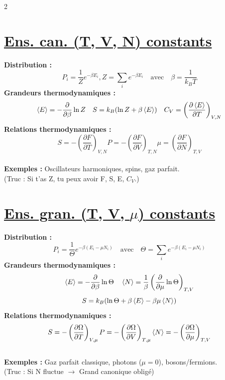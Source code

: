 \documentclass[11pt]{article}
\begin{document}
\begin{multicols}{2}
\section{\underline{Ens. can. (T, V, N) constants}}
\textbf{Distribution :}
\begin{equation*}
  \boxed{P_i = \frac{1}{Z} e^{-\beta E_i}}, \boxed{Z = \sum_i e^{-\beta E_i}} \quad \text{avec} \quad \beta = \frac{1}{k_B T}
\end{equation*}
\textbf{Grandeurs thermodynamiques :}
\begin{equation*}
  \braket{E}=-\dfrac{\partial}{\partial\beta} \ln Z \quad S = k_B(\ln Z + \beta \braket{E})\quad C_V = \left( \frac{\partial \braket{E}}{\partial T} \right)_{V, N}
\end{equation*}
\textbf{Relations thermodynamiques :}
\begin{equation*}
  S = -\left( \frac{\partial F}{\partial T} \right)_{V, N}  P = -\left( \frac{\partial F}{\partial V} \right)_{T, N}  \mu = \left( \frac{\partial F}{\partial N} \right)_{T, V}
\end{equation*}\\
\textbf{Exemples :} Oscillateurs harmoniques, spins, gaz parfait.\\
(Truc : Si t'as Z, tu peux avoir F, S, E, $C_V$.)\\

\section{\underline{Ens. gran. (T, V, $\mu$) constants}}
\textbf{Distribution :}
\begin{equation*}
  \boxed{P_i = \frac{1}{\Theta} e^{-\beta (E_i - \mu N_i)}} \quad \text{avec} \quad \boxed{\Theta = \sum_i e^{-\beta (E_i - \mu N_i)}}
\end{equation*}
\textbf{Grandeurs thermodynamiques :}
\begin{equation*}
  \braket{E} = -\frac{\partial}{\partial \beta} \ln \Theta \quad \braket{N} = \frac{1}{\beta} \left( \frac{\partial}{\partial \mu} \ln \Theta \right)_{T, V}
\end{equation*}
\begin{equation*}
  S = k_B (\ln \Theta + \beta \braket{E} - \beta \mu \braket{N})
\end{equation*}
\textbf{Relations thermodynamiques :}
\begin{equation*}
  S = -\left( \frac{\partial \Omega}{\partial T} \right)_{V, \mu}  P = -\left( \frac{\partial \Omega}{\partial V} \right)_{T, \mu} \braket{N} = -\left( \frac{\partial \Omega}{\partial \mu} \right)_{T, V}
\end{equation*}\\
\textbf{Exemples :} Gaz parfait classique, photons ($\mu=0$), bosons/fermions.\\
(Truc : Si N fluctue $\rightarrow$ Grand canonique obligé)\\


\end{multicols}
\end{document}
